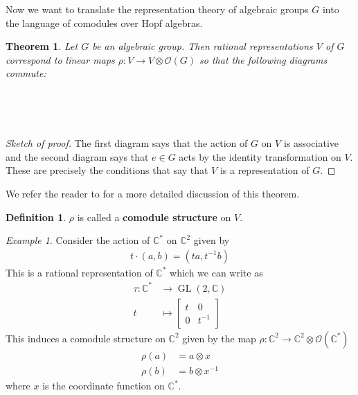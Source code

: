 \documentclass{amsart}
\DeclareMathOperator{\id}{id}
\DeclareMathOperator{\GL}{GL}
\newcommand{\C}{\mathbb{C}}
\newcommand{\inv}[1]{{#1}^{-1}}
\newcommand{\mc}[1]{\mathcal{#1}}
\numberwithin{equation}{section}
\theoremstyle{plain} %
\newtheorem{theorem}[equation]{Theorem}
\theoremstyle{definition}
\newtheorem{definition}[equation]{Definition}
\theoremstyle{remark}
\newtheorem{example}[equation]{Example}
\begin{document}
\hfill

Now we want to translate the representation theory of algebraic groups $G$
into the language of comodules over Hopf algebras.
\begin{theorem}
	Let $G$ be an algebraic group. Then rational representations $V$ of $G$
	correspond to linear maps $\rho: V\to V\otimes \mc O(G)$ so that the following diagrams commute:
	\begin{center}
		 \\
		\vspace{5mm}
		 \\
	\end{center}
\end{theorem}
\begin{proof}
	[Sketch of proof] The first diagram says that the action of $G$ on $V$ is associative
	and the second diagram says that $e\in G$ acts by the identity transformation on $V$.
	These are precisely the conditions that say that $V$ is a representation of $G$.
\end{proof}
We refer the reader to \cite{waterhouse} for a more detailed discussion of this theorem.

\begin{definition}
	$\rho$ is called a \textbf{comodule structure} on $V$.
\end{definition}

\begin{example}
	Consider the action of $\C^*$ on $\C^2$ given by
	\begin{align*}
		t\cdot (a,b) = (ta, t^{-1}b)
	\end{align*} This is a rational representation of $\C^*$ which we can write as
	\begin{align*}
		\tau:\C^* & \to \GL(2,\C)          \\
		t            & \mapsto \begin{bmatrix}
			                       t & 0       \\
			                       0 & \inv{t}
		                       \end{bmatrix}
	\end{align*} This induces a comodule structure on $\C^2$ given by the map $\rho: \C^2\to \C^2\otimes \mc O(\C^*)$ 
	\begin{align*}
		\rho(a) & = a\otimes x       \\
		\rho(b) & = b\otimes \inv{x}
	\end{align*} where $x$ is the coordinate function on $\C^*$.
\end{example}
\end{document}
